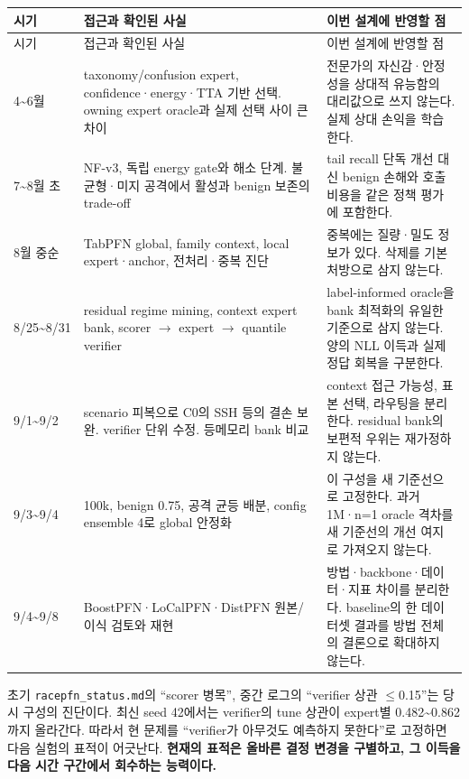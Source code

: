 \begingroup
\footnotesize
\begin{longtable}{>{\raggedright\arraybackslash}p{}>{\raggedright\arraybackslash}p{}>{\raggedright\arraybackslash}p{}}
\toprule
시기 & 접근과 확인된 사실 & 이번 설계에 반영할 점 \\ \midrule
\endfirsthead
시기 & 접근과 확인된 사실 & 이번 설계에 반영할 점 \\ \midrule
\endhead
{}4\textasciitilde{}6월 & taxonomy/\allowbreak{}confusion expert, confidence·energy·TTA 기반 선택. owning expert oracle과 실제 선택 사이 큰 차이 & 전문가의 자신감·안정성을 상대적 유능함의 대리값으로 쓰지 않는다. 실제 상대 손익을 학습한다. \\
{}7\textasciitilde{}8월 초 & NF-v3, 독립 energy gate와 해소 단계. 불균형·미지 공격에서 활성과 benign 보존의 trade-off & tail recall 단독 개선 대신 benign 손해와 호출 비용을 같은 정책 평가에 포함한다. \\
{}8월 중순 & TabPFN global, family context, local expert·anchor, 전처리·중복 진단 & 중복에는 질량·밀도 정보가 있다. 삭제를 기본 처방으로 삼지 않는다. \\
{}8/\allowbreak{}25\textasciitilde{}8/\allowbreak{}31 & residual regime mining, context expert bank, scorer \ensuremath{\rightarrow} expert \ensuremath{\rightarrow} quantile verifier & label-informed oracle을 bank 최적화의 유일한 기준으로 삼지 않는다. 양의 NLL 이득과 실제 정답 회복을 구분한다. \\
{}9/\allowbreak{}1\textasciitilde{}9/\allowbreak{}2 & scenario 피복으로 C0의 SSH 등의 결손 보완. verifier 단위 수정. 등메모리 bank 비교 & context 접근 가능성, 표본 선택, 라우팅을 분리한다. residual bank의 보편적 우위는 재가정하지 않는다. \\
{}9/\allowbreak{}3\textasciitilde{}9/\allowbreak{}4 & 100k, benign 0.75, 공격 균등 배분, config ensemble 4로 global 안정화 & 이 구성을 새 기준선으로 고정한다. 과거 1M·n=\allowbreak{}1 oracle 격차를 새 기준선의 개선 여지로 가져오지 않는다. \\
{}9/\allowbreak{}4\textasciitilde{}9/\allowbreak{}8 & BoostPFN·LoCalPFN·DistPFN 원본/\allowbreak{}이식 검토와 재현 & 방법·backbone·데이터·지표 차이를 분리한다. baseline의 한 데이터셋 결과를 방법 전체의 결론으로 확대하지 않는다. \\
\bottomrule
\end{longtable}
\endgroup
초기 \texttt{racepfn\_\allowbreak{}\allowbreak{}status.\allowbreak{}m\allowbreak{}d}의 “scorer 병목”, 중간 로그의 “verifier 상관 \ensuremath{\leq}0.15”는 당시 구성의 진단이다. 최신 seed 42에서는 verifier의 tune 상관이 expert별 0.482\textasciitilde{}0.862까지 올라간다. 따라서 현 문제를 “verifier가 아무것도 예측하지 못한다”로 고정하면 다음 실험의 표적이 어긋난다. \textbf{현재의 표적은 올바른 결정 변경을 구별하고, 그 이득을 다음 시간 구간에서 회수하는 능력이다.}

